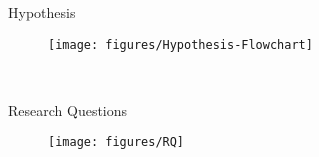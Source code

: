 
\begin{frame}{Hypothesis}
    \begin{figure}
        \centering
        \texttt{[image: figures/Hypothesis-Flowchart]}
    \end{figure}  
\end{frame}

\begin{frame}{Research Questions}
    \begin{figure}
        \centering
        \texttt{[image: figures/RQ]}
    \end{figure} 
\end{frame}